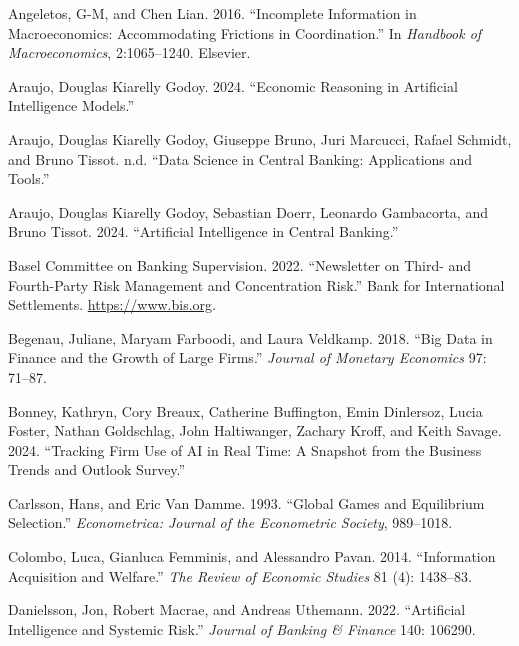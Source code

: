 \documentclass[
]{article}
\newlength{\cslhangindent}
\newenvironment{CSLReferences}[2] %
 {\begin{list}{}{%
  \setlength{\itemindent}{0pt}
  \setlength{\leftmargin}{0pt}
  \setlength{\parsep}{0pt}
  \ifodd #1
   \setlength{\leftmargin}{\cslhangindent}
   \setlength{\itemindent}{-1\cslhangindent}
  \fi
  \setlength{\itemsep}{#2\baselineskip}}}
 {\end{list}}
\theoremstyle{plain}
\theoremstyle{remark}
\begin{document}
\label{refs}
\begin{CSLReferences}{1}{0}
Angeletos, G-M, and Chen Lian. 2016. {``Incomplete Information in
Macroeconomics: Accommodating Frictions in Coordination.''} In
\emph{Handbook of Macroeconomics}, 2:1065--1240. Elsevier.

Araujo, Douglas Kiarelly Godoy. 2024. {``Economic Reasoning in
Artificial Intelligence Models.''}

Araujo, Douglas Kiarelly Godoy, Giuseppe Bruno, Juri Marcucci, Rafael
Schmidt, and Bruno Tissot. n.d. {``Data Science in Central Banking:
Applications and Tools.''}

Araujo, Douglas Kiarelly Godoy, Sebastian Doerr, Leonardo Gambacorta,
and Bruno Tissot. 2024. {``Artificial Intelligence in Central
Banking.''}

Basel Committee on Banking Supervision. 2022. {``{Newsletter on Third-
and Fourth-Party Risk Management and Concentration Risk}.''} {Bank for
International Settlements}. \url{https://www.bis.org}.

Begenau, Juliane, Maryam Farboodi, and Laura Veldkamp. 2018. {``Big Data
in Finance and the Growth of Large Firms.''} \emph{Journal of Monetary
Economics} 97: 71--87.

Bonney, Kathryn, Cory Breaux, Catherine Buffington, Emin Dinlersoz,
Lucia Foster, Nathan Goldschlag, John Haltiwanger, Zachary Kroff, and
Keith Savage. 2024. {``Tracking Firm Use of AI in Real Time: A Snapshot
from the Business Trends and Outlook Survey.''}

Carlsson, Hans, and Eric Van Damme. 1993. {``Global Games and
Equilibrium Selection.''} \emph{Econometrica: Journal of the Econometric
Society}, 989--1018.

Colombo, Luca, Gianluca Femminis, and Alessandro Pavan. 2014.
{``Information Acquisition and Welfare.''} \emph{The Review of Economic
Studies} 81 (4): 1438--83.

Danielsson, Jon, Robert Macrae, and Andreas Uthemann. 2022.
{``Artificial Intelligence and Systemic Risk.''} \emph{Journal of
Banking \& Finance} 140: 106290.


\end{CSLReferences}
\end{document}
